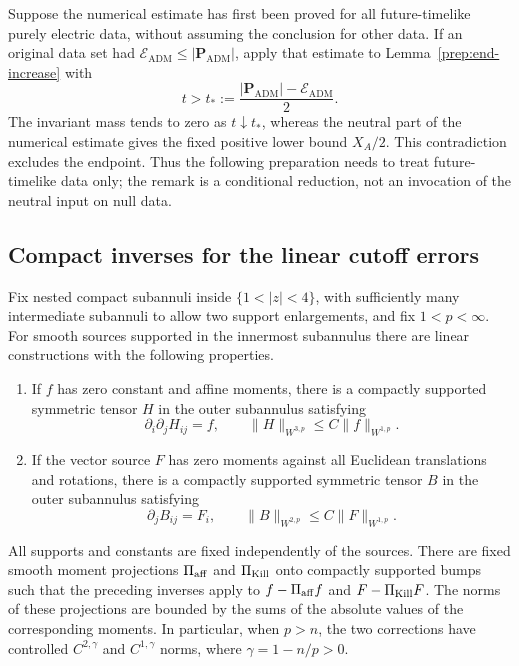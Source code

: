 \begin{remark}
\label{prep:endpoint-order}
Suppose the numerical estimate has first been proved for all
future-timelike purely electric data, without assuming the conclusion
for other data.  If an original data set had
$\mathcal E_{\mathrm{ADM}}\leq|\mathbf P_{\mathrm{ADM}}|$, apply that
estimate to Lemma~\ref{prep:end-increase} with
\[
 t>t_*:=\frac{|\mathbf P_{\mathrm{ADM}}|
                    -\mathcal E_{\mathrm{ADM}}}{2}.
\]
The invariant mass tends to zero as $t\downarrow t_*$, whereas the
neutral part of the numerical estimate gives the fixed positive lower
bound $X_A/2$.  This contradiction excludes the endpoint.  Thus the
following preparation needs to treat future-timelike data only; the
remark is a conditional reduction, not an invocation of the neutral
input on null data.
\end{remark}

\subsection{Compact inverses for the linear cutoff errors}

\begin{lemma}
\label{prep:compact-inverses}
Fix nested compact subannuli inside $\{1<|z|<4\}$, with sufficiently
many intermediate subannuli to allow two support enlargements, and fix
$1<p<\infty$.  For smooth sources supported in the innermost subannulus
there are linear constructions with the following properties.
\begin{enumerate}[label=(\roman*)]
\item If $f$ has zero constant and affine moments, there is a compactly
supported symmetric tensor $H$ in the outer subannulus satisfying
\[
 \partial_i\partial_jH_{ij}=f,
 \qquad \|H\|_{W^{3,p}}\leq C\|f\|_{W^{1,p}}.
\]
\item If the vector source $F$ has zero moments against all Euclidean
translations and rotations, there is a compactly supported symmetric
tensor $B$ in the outer subannulus satisfying
\[
 \partial_jB_{ij}=F_i,
 \qquad \|B\|_{W^{2,p}}\leq C\|F\|_{W^{1,p}}.
\]
\end{enumerate}
All supports and constants are fixed independently of the sources.
There are fixed smooth moment projections $\Pi_{\rm aff}$ and
$\Pi_{\rm Kill}$ onto compactly supported bumps such that the preceding
inverses apply to $f-\Pi_{\rm aff}f$ and $F-\Pi_{\rm Kill}F$.
The norms of these projections are bounded by the sums of the absolute
values of the corresponding moments.  In particular, when $p>n$, the
two corrections have controlled $C^{2,\gamma}$ and $C^{1,\gamma}$ norms,
where $\gamma=1-n/p>0$.
\end{lemma}

